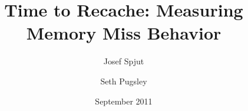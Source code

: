 \documentclass[times, 10pt, twocolumn]{article}
\begin{document}
\title{Time to Recache: Measuring Memory Miss Behavior}

\author[$\dag$]{Josef Spjut}
\author[$\dag$]{Seth Pugsley}
\date{September 2011}

\maketitle

\begin{abstract}

\end{abstract}













\end{document}
